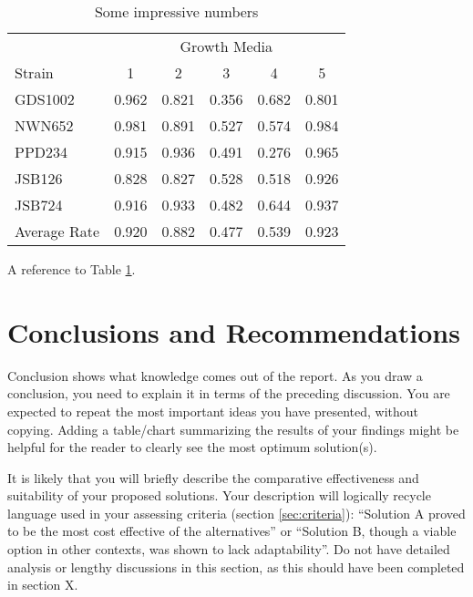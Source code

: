 \documentclass{article}
\begin{document}
\begin{table}
\centering %
\begin{tabular}{l c c c c c}

\toprule %
& \multicolumn{5}{c}{Growth Media} \\ %
\cmidrule(l){2-6} %
Strain & 1 & 2 & 3 & 4 & 5\\ %
\midrule %
GDS1002 & 0.962 & 0.821 & 0.356 & 0.682 & 0.801\\ %
NWN652 & 0.981 & 0.891 & 0.527 & 0.574 & 0.984\\ %
PPD234 & 0.915 & 0.936 & 0.491 & 0.276 & 0.965\\ %
JSB126 & 0.828 & 0.827 & 0.528 & 0.518 & 0.926\\ %
JSB724 & 0.916 & 0.933 & 0.482 & 0.644 & 0.937\\ %
\midrule %
\midrule %
Average Rate & 0.920 & 0.882 & 0.477 & 0.539 & 0.923\\ %
\bottomrule %
\end{tabular}
\smallskip
\caption{Some impressive numbers} %
\label{tab:template} %
\end{table}

A reference to Table \ref{tab:template}.


\section{Conclusions and Recommendations}
Conclusion shows what knowledge comes out of the report. As you draw a conclusion, you need to explain it in terms of the preceding discussion. You are expected to repeat the most important ideas you have presented, without copying. Adding a table/chart summarizing the results of your findings might be helpful for the reader to clearly see the most optimum solution(s).

It is likely that you will briefly describe the comparative effectiveness and suitability of your proposed solutions. Your description will logically recycle language used in your assessing criteria (section \ref{sec:criteria}): ``Solution A proved to be the most cost effective of the alternatives'' or ``Solution B, though a viable option in other contexts, was shown to lack adaptability''.  Do not have detailed analysis or lengthy discussions in this section, as this should have been completed in section X.
\end{document}

